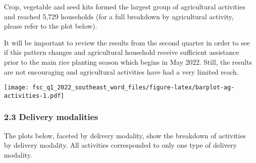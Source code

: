 \documentclass[
]{article}
\begin{document}
Crop, vegetable and seed kits formed the largest group of agricultural
activities and reached 5,729 households (for a full breakdown by
agricultural activity, please refer to the plot below).

It will be important to review the results from the second quarter in
order to see if this pattern changes and agricultural household receive
sufficient assistance prior to the main rice planting season which
begins in May 2022. Still, the results are not encouraging and
agricultural activities have had a very limited reach.

\texttt{[image: fsc\_q1\_2022\_southeast\_word\_files/figure-latex/barplot-ag-activities-1.pdf]}

\hypertarget{delivery-modalities}{%
\subsubsection{2.3 Delivery modalities}\label{delivery-modalities}}

The plots below, faceted by delivery modality, show the breakdown of
activities by delivery modality. All activities corresponded to only one
type of delivery modality.
\end{document}
